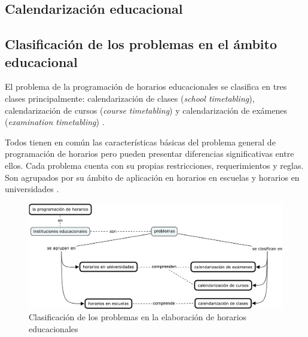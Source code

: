 \documentclass[spanish,draft,12pt,headsepline,footsepline,paper=letter]{scrreprt}
\begin{document}

\subsection{Calendarización educacional} %
\label{calendarizacion_educacional}


\subsection{Clasificación de los problemas en el ámbito educacional}
\label{clasificacion_problemas}

El problema de la programación de horarios educacionales se clasifica en tres clases principalmente:
calendarización de clases (\textit{school timetabling}),
calendarización de cursos (\textit{course timetabling}) y
calendarización de exámenes (\textit{examination timetabling}) \citep[p.~88]{schaerf99a-survey-of-automated}.

Todos tienen en común las características básicas del problema general de programación de horarios pero pueden presentar diferencias significativas entre ellos. Cada problema cuenta con su propias restricciones, requerimientos y reglas. Son agrupados por su ámbito de aplicación en horarios en escuelas y horarios en universidades \citep[p.~10]{abdullah06heuristic-approaches}.

\begin{figure}[hbtp]
\centering
\includegraphics[width=\textwidth]{timetabling_classification.pdf}
\caption[Clasificación del problema]{Clasificación de los problemas en la elaboración de horarios educacionales}
\label{fig:timetabling_classification}
\end{figure}
\end{document}
